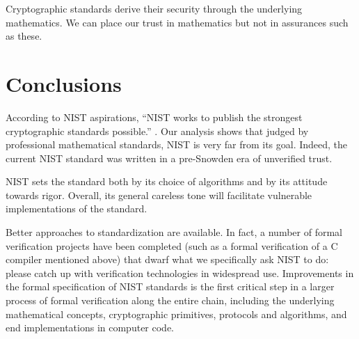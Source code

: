 \documentclass[11pt]{amsart} %
\begin{document}
Cryptographic standards derive their security through the
underlying mathematics.   We can place our trust in mathematics but not in assurances such as these.

\section{Conclusions}


According to NIST aspirations,
``NIST works to publish the strongest cryptographic standards possible.'' \cite{NIST-Supp}.
Our analysis shows that judged by professional mathematical standards, NIST is 
very far from its goal. Indeed, the current NIST standard was written in a pre-Snowden era of unverified trust.


NIST sets the standard both
by its choice of algorithms and by its attitude towards rigor.
Overall,  its general careless tone will 
facilitate vulnerable implementations of the standard.  

Better approaches to standardization are available.  In fact,
a number of formal verification projects have been completed (such as a formal verification of a C compiler
mentioned above) that dwarf what we specifically ask NIST  to do: please
catch up with verification technologies in widespread use.
Improvements in the formal specification of NIST standards is the first
critical step in a larger process of formal verification along the entire chain, including
the
underlying mathematical concepts, cryptographic primitives, protocols and algorithms, 
and end implementations
in computer code.


 



\end{document}

